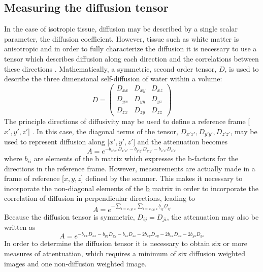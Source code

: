 \subsection{Measuring the diffusion tensor}
In the case of isotropic tissue, diffusion may be described by a single scalar parameter, the diffusion coefficient.  However, tissue such as white matter is anisotropic and in order to fully characterize the diffusion it is necessary to use a tensor which describes diffusion along each direction and the correlations between these directions \cite{LeBihanJMRI2001}.  Mathematically, a symmetric, second order tensor, $D$, is used to describe the three dimensional self-diffusion of water within a volume:
$$ \underline{D} = \begin{pmatrix} 
	D_{xx} & D_{xy} & D_{xz} \\
	D_{yx} & D_{yy} & D_{yz} \\
	D_{zx} & D_{zy} & D_{zz}
	\end{pmatrix}
$$
The principle directions of diffusivity may be used to define a reference frame [$x', y', z'$] .  In this case, the diagonal terms of the tensor, $D_{x'x'}, D_{y'y'}, D_{z'z'}$, may be used to represent diffusion along [$x', y', z'$] and the attenuation becomes
\begin{equation}
\label{eq:attenuation3}
A = e^{-b_{x'x'}D_{x'x'} - b_{y'y'}D_{y'y'} - b_{z'z'}D_{z'z'}}
\end{equation}
where $b_{ii}$ are elements of the b matrix which expresses the b-factors for the directions in the reference frame.  However, measurements are actually made in a frame of reference [$x,y,z$] defined by the scanner.  This makes it necessary to incorporate the non-diagonal elements of the \underline{b} matrix in order to incorporate the correlation of diffusion in perpendicular directions, leading to
\begin{equation}
\label{eq:attenuation6}
A = e^{- \sum_{i=x,y,z}{ \sum_{i=x,y,z}{ \underline{b}_{ij}\underline{D}_{ij} } } }
\end{equation}
Because the diffusion tensor is symmetric, $D_{ij} = D_{ji}$, the attenuation may also be written as
\begin{equation}
\label{eq:attenuationfull}
A = e^{-b_{xx}D_{xx} - b_{yy}D_{yy} - b_{zz}D_{zz} - 2b_{xy}D_{xy} - 2b_{xz}D_{xz} - 2b_{yz}D_{yz} }
\end{equation}
In order to determine the diffusion tensor it is necessary to obtain six or more measures of attentuation, which requires a minimum of six diffusion weighted images and one non-diffusion weighted image.
  
